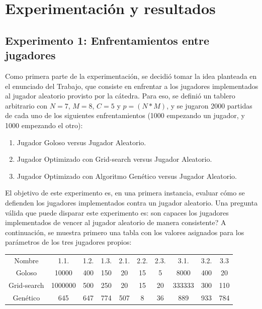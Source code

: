 \documentclass[12pt,a4paper]{article}
\begin{document}
\newpage

		
	
\section{Experimentación y resultados}


    \subsection{Experimento 1: Enfrentamientos entre jugadores}
    
    Como primera parte de la experimentación, se decidió tomar la idea planteada en el enunciado del Trabajo, que consiste en enfrentar a los jugadores implementados al jugador aleatorio provisto por la cátedra. Para eso, se definió un tablero arbitrario con $N=7$, $M=8$, $C=5$ y $p=(N*M)$, y se jugaron 2000 partidas de cada uno de los siguientes enfrentamientos (1000 empezando un jugador, y 1000 empezando el otro):
        \begin{enumerate}
            \item Jugador Goloso versus Jugador Aleatorio.
            \item Jugador Optimizado con Grid-search versus Jugador Aleatorio.
            \item Jugador Optimizado con Algoritmo Genético versus Jugador Aleatorio.
        \end{enumerate}
    
    El objetivo de este experimento es, en una primera instancia, evaluar cómo se defienden los jugadores implementados contra un jugador aleatorio. Una pregunta válida que puede disparar este experimento es: \textquestiondown son capaces los jugadores implementados de vencer al jugador aleatorio de manera consistente? A continuación, se muestra primero una tabla con los valores asignados para los parámetros de los tres jugadores propios:
    
    \begin{center}
		\begin{tabular}{ | c || c | c | c | c | c | c | c | c | c | }
		\hline
		Nombre &  1.1. &  1.2. &  1.3. &  2.1. &  2.2. &  2.3. &  3.1. &  3.2. &  3.3 \\ \hhline{|=#=|=|=|=|=|=|=|=|=|}
            Goloso &  10000 &  400 &  150 &  20 &  15 &  5 &  8000 &  400 &  20 \\ \hline
		    Grid-search &  1000000 &  500 &  250 &  20 &  15 &  20 &  333333 &  300 &  110 \\ \hline
		    Genético &  645 &  647 &  774 &  507 &  8 &  36 &  889 &  933 &  784 \\ \hline
		\end{tabular}
    \end{center}
    
\end{document}
